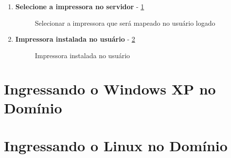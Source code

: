 \begin{enumerate}
	\item \textbf{Selecione a impressora no servidor} - \ref{selecionar_impressora_servidor}
	\begin{figure}[ht]
	   	\centering
	   	\caption{Selecionar a impressora que será mapeado no usuário logado}
	    \label{selecionar_impressora_servidor}
	\end{figure}
	
	\item \textbf{Impressora instalada no usuário} - \ref{impressora_compartilhada}
	\begin{figure}[ht]
	   	\centering
	   	\caption{Impressora instalada no usuário}
	    \label{impressora_compartilhada}
	\end{figure}
	
\end{enumerate}

\section{Ingressando o Windows XP no Domínio}

\section{Ingressando o Linux no Domínio}

